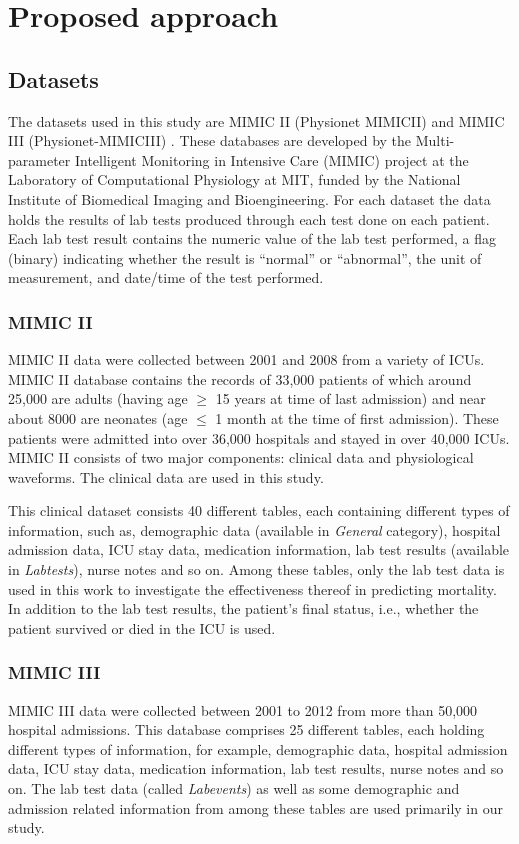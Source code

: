 \section{Proposed approach} \label{s:methods}

\subsection{Datasets} \label{sec:datapreparation}
The datasets used in this study are MIMIC II (Physionet MIMICII) \cite{MIMIC2} and MIMIC III (Physionet-MIMICIII) \cite{MIMIC3}. These databases are developed by the Multi-parameter Intelligent Monitoring in Intensive Care (MIMIC) project at the Laboratory of Computational Physiology at MIT, funded by the National Institute of Biomedical Imaging and Bioengineering. For each dataset the data holds the results of lab tests produced through each test done on each patient. Each lab test result contains the numeric value of the lab test performed, a flag (binary) indicating whether the result is ``normal'' or ``abnormal'', the unit of measurement, and date/time of the test performed. 

\subsubsection{MIMIC II} \label{sec:MIMIC2}
MIMIC II data were collected between 2001 and 2008 from a variety of ICUs. MIMIC II database contains the records of 33,000 patients of which around 25,000 are adults (having age $\geq$ 15 years at time of last admission) and near about 8000 are neonates (age $\leq$ 1 month at the time of first admission). These patients were admitted into over 36,000 hospitals and stayed in over 40,000 ICUs. MIMIC II consists of two major components: clinical data and physiological waveforms. The clinical data are used in this study.   

This clinical dataset consists 40 different tables, each containing different types of information, such  as, demographic data (available in \textit{General} category), hospital admission data, ICU stay data, medication information, lab test results (available in \textit{Labtests}), nurse notes and so on. Among these tables, only the lab test data is used in this work to investigate the effectiveness thereof in predicting mortality. In addition to the lab test results, the patient's final status, i.e., whether the patient survived or died in the ICU is used. 

\subsubsection{MIMIC III} \label{sec:MIMIC3}
MIMIC III data were collected between 2001 to 2012 from more than 50,000 hospital admissions. This database comprises 25 different tables, each holding different types of information, for example, demographic data, hospital admission data, ICU stay data, medication information, lab test results, nurse notes and so on. The lab test data (called \textit{Labevents}) as well as some demographic and admission related information from among these tables are used primarily in our study.

